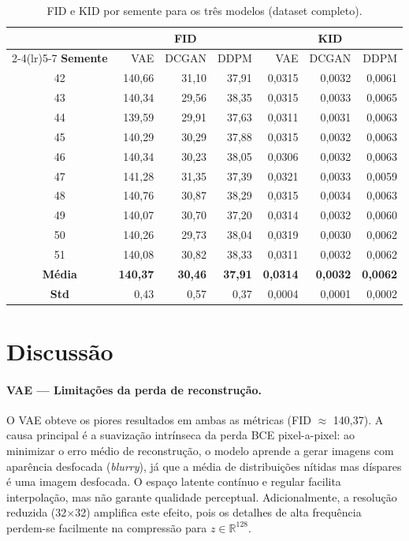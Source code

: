 \documentclass[12pt,a4paper]{article}
\begin{document}
\begin{table}[H]
  \centering
  \caption{FID e KID por semente para os três modelos (dataset completo).}
  \label{tab:sementes}
  \setlength{\tabcolsep}{5pt}
  \begin{tabular}{c rr r rr r}
    \toprule
    & \multicolumn{3}{c}{\textbf{FID}} & \multicolumn{3}{c}{\textbf{KID}} \\
    \cmidrule(lr){2-4}\cmidrule(lr){5-7}
    \textbf{Semente} & VAE & DCGAN & DDPM & VAE & DCGAN & DDPM \\
    \midrule
    42 & 140,66 & 31,10 & 37,91 & 0,0315 & 0,0032 & 0,0061 \\
    43 & 140,34 & 29,56 & 38,35 & 0,0315 & 0,0033 & 0,0065 \\
    44 & 139,59 & 29,91 & 37,63 & 0,0311 & 0,0031 & 0,0063 \\
    45 & 140,29 & 30,29 & 37,88 & 0,0315 & 0,0032 & 0,0063 \\
    46 & 140,34 & 30,23 & 38,05 & 0,0306 & 0,0032 & 0,0063 \\
    47 & 141,28 & 31,35 & 37,39 & 0,0321 & 0,0033 & 0,0059 \\
    48 & 140,76 & 30,87 & 38,29 & 0,0315 & 0,0034 & 0,0063 \\
    49 & 140,07 & 30,70 & 37,20 & 0,0314 & 0,0032 & 0,0060 \\
    50 & 140,26 & 29,73 & 38,04 & 0,0319 & 0,0030 & 0,0062 \\
    51 & 140,08 & 30,82 & 38,33 & 0,0311 & 0,0032 & 0,0062 \\
    \midrule
    \textbf{Média} & \textbf{140,37} & \textbf{30,46} & \textbf{37,91}
                   & \textbf{0,0314} & \textbf{0,0032} & \textbf{0,0062} \\
    \textbf{Std}   & 0,43 & 0,57 & 0,37 & 0,0004 & 0,0001 & 0,0002 \\
    \bottomrule
  \end{tabular}
\end{table}

\section{Discussão}

\paragraph{VAE — Limitações da perda de reconstrução.}
O VAE obteve os piores resultados em ambas as métricas (FID $\approx$ 140,37).
A causa principal é a suavização intrínseca da perda BCE pixel-a-pixel: ao
minimizar o erro médio de reconstrução, o modelo aprende a gerar imagens com
aparência desfocada (\textit{blurry}), já que a média de distribuições nítidas
mas díspares é uma imagem desfocada. O espaço latente contínuo e regular facilita
interpolação, mas não garante qualidade perceptual. Adicionalmente, a resolução
reduzida (32$\times$32) amplifica este efeito, pois os detalhes de alta frequência
perdem-se facilmente na compressão para $z \in \mathbb{R}^{128}$.
\end{document}
